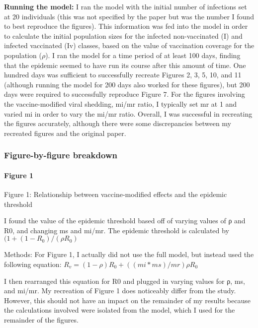 \documentclass[]{article}
\let\oldparagraph\paragraph
\renewcommand{\paragraph}[1]{\oldparagraph{#1}\mbox{}}
\begin{document}
\textbf{Running the model:} I ran the model with the initial number of
infections set at 20 individuals (this was not specified by the paper
but was the number I found to best reproduce the figures). This
information was fed into the model in order to calculate the initial
population sizes for the infected non-vaccinated (I) and infected
vaccinated (Iv) classes, based on the value of vaccination coverage for
the population (\(\rho\)). I ran the model for a time period of at least
100 days, finding that the epidemic seemed to have run its course after
this amount of time. One hundred days was sufficient to successfully
recreate Figures 2, 3, 5, 10, and 11 (although running the model for 200
days also worked for these figures), but 200 days were required to
successfully reproduce Figure 7. For the figures involving the
vaccine-modified viral shedding, mi/mr ratio, I typically set mr at 1
and varied mi in order to vary the mi/mr ratio. Overall, I was
successful in recreating the figures accurately, although there were
some discrepancies between my recreated figures and the original paper.

\hypertarget{figure-by-figure-breakdown}{%
\subsubsection{Figure-by-figure
breakdown}\label{figure-by-figure-breakdown}}

\hypertarget{figure-1}{%
\paragraph{Figure 1}\label{figure-1}}

Figure 1: Relationship between vaccine-modified effects and the epidemic
threshold

I found the value of the epidemic threshold based off of varying values
of ρ and R0, and changing ms and mi/mr. The epidemic threshold is
calculated by \((1 + (1 - R_0) / (ρR_0)\)

Methods: For Figure 1, I actually did not use the full model, but
instead used the following equation:
\(R_v = (1-ρ)R_0 + ((mi*ms)/mr)ρR_0\)

I then rearranged this equation for R0 and plugged in varying values for
ρ, ms, and mi/mr. My recreation of Figure 1 does noticeably differ from
the study. However, this should not have an impact on the remainder of
my results because the calculations involved were isolated from the
model, which I used for the remainder of the figures.
\end{document}

